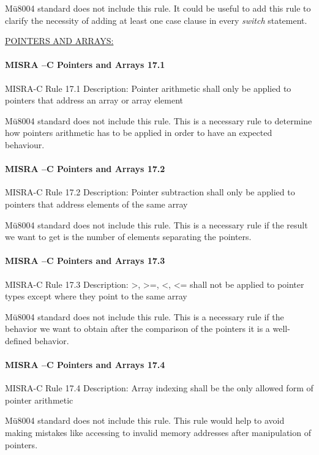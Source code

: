 Mü8004 standard does not include this rule. It could be useful to add this rule to clarify the necessity of adding at least one case clause in every \textit{switch} statement.

\begin{center}
\textsc{\underline{POINTERS AND ARRAYS:}}
\end{center}

\paragraph{MISRA –C Pointers and Arrays 17.1}
MISRA-C Rule 17.1 Description: Pointer arithmetic shall only be applied to pointers that address an array or array element

Mü8004 standard does not include this rule. This is a necessary rule to determine how pointers arithmetic has to be applied in order to have an expected behaviour.

\paragraph{MISRA –C Pointers and Arrays 17.2}
MISRA-C Rule 17.2 Description: Pointer subtraction shall only be applied to pointers that address elements of the same array

Mü8004 standard does not include this rule. This is a necessary rule if the result we want to get is the number of elements separating the pointers.

\paragraph{MISRA –C Pointers and Arrays 17.3}
MISRA-C Rule 17.3 Description: >, >=, <, <= shall not be applied to pointer types except where they point to the same array

Mü8004 standard does not include this rule. This is a necessary rule if the behavior we want to obtain after the comparison of the pointers it is a well-defined behavior.

\paragraph{MISRA –C Pointers and Arrays 17.4}
MISRA-C Rule 17.4 Description: Array indexing shall be the only allowed form of pointer arithmetic

Mü8004 standard does not include this rule. This rule would help to avoid making mistakes like accessing to invalid memory addresses after manipulation of pointers.

